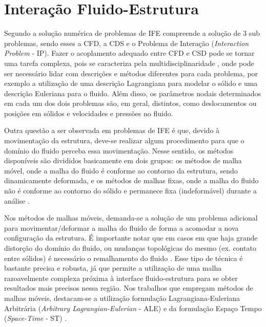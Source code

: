 \section{Interação Fluido-Estrutura} \label{IFE}

Segundo  a solução numérica de problemas de IFE compreende a solução de 3 sub problemas, sendo esses a CFD, a CDS e o Problema de Interação (\textit{Interaction Problem} - IP). Fazer o acoplamento adequado entre CFD e CSD pode se tornar uma tarefa complexa, pois se caracteriza pela multidisciplinaridade \cite{hou2012numerical}, onde pode ser necessário lidar com descrições e métodos diferentes para cada problema, por exemplo a utilização de uma descrição Lagrangiana para modelar o sólido e uma descrição Euleriana para o fluido. Além disso, os parâmetros nodais determinados em cada um dos dois problemas são, em geral, distintos, como deslocamentos ou posições em sólidos e velocidades e pressões no fluido.

Outra questão a ser observada em problemas de IFE é que, devido à movimentação da estrutura, deve-se realizar algum procedimento para que o domínio do fluido perceba essa movimentação. Nesse sentido, os métodos disponíveis são divididos basicamente em dois grupos: os métodos de malha móvel, onde a malha do fluido é conforme ao contorno da estrutura, sendo dinamicamente deformada, e os métodos de malhas fixas, onde a malha do fluido não é conforme ao contorno do sólido e permanece fixa (indeformável) durante a análise \cite{fernandes2020tecnica}.

Nos métodos de malhas móveis, demanda-se a solução de um problema adicional para movimentar/deformar a malha do fluido de forma a acomodar a nova configuração da estrutura. É importante notar que em casos em que haja grande distorção do domínio do fluido, ou mudanças topológicas do mesmo (ex. contato entre sólidos) é necessário o remalhamento do fluido \cite{terahara2020heart}. Esse tipo de técnica é bastante precisa e robusta, já que permite a utilização de uma malha razoavelmente complexa próxima à interface fluido-estrutura para se obter resultados mais precisos nessa região. Nos trabalhos que empregam métodos de malhas móveis, destacam-se a utilização formulação Lagrangiana-Euleriana Arbitrária (\textit{Arbitrary Lagrangian-Eulerian} - ALE) \cite{donea1982arbitrary,kanchi20073d,fernandes2019ale} e da formulação Espaço Tempo (\textit{Space-Time} - ST) \cite{takizawa2011multiscale,terahara2020heart,takizawa2011stabilized}.

